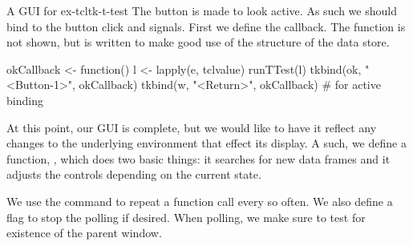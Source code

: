 \begin{example}{A GUI for }{ex-tcltk-t-test}
The  button is made to look active. As such we should bind to the button click and  signals. First we define the callback. The  function is not shown, but is written to make good use of the structure of the data store.
\begin{Schunk}
\begin{Sinput}
 okCallback <- function() {
   l <- lapply(e, tclvalue)
   runTTest(l)
 }
 tkbind(ok, "<Button-1>", okCallback)
 tkbind(w, "<Return>", okCallback)        # for active binding
\end{Sinput}
\end{Schunk}

At this point, our GUI is complete, but we would like to have it
reflect any changes to the underlying \R\/ environment that effect its
display. A such, we define
a function, , which does two basic things: it searches for
new data frames and it adjusts the controls depending on the current
state.
\begin{Schunk}
\end{Schunk}

We use the  command to repeat a function call every so often. We also define a flag to stop the polling if desired. When polling, we make sure to test for existence of the parent window. 
\begin{Schunk}
\end{Schunk}

\end{example}


